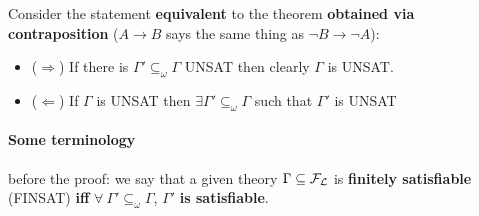 	Consider the statement \textbf{equivalent} to the theorem \textbf{obtained via contraposition} ($A \rightarrow B$ says the same thing as $\neg B \rightarrow \neg A$):
	\begin{itemize}
		\item ($\Rightarrow$) If there is $\Gamma' \subseteq_\omega \Gamma$ UNSAT then clearly $\Gamma$ is UNSAT.

		\item ($\Leftarrow$) If $\Gamma$ is UNSAT then $\exists \Gamma' \subseteq_\omega \Gamma$ such that $\Gamma'$ is UNSAT
	  \end{itemize}

	\newpage

	\paragraph{Some terminology} before the proof: we say that a given theory $\Gamma \subseteq \mathcal{F}_\mathcal{L}$ is \textbf{finitely satisfiable} (FINSAT) \textbf{iff} $\forall \ \Gamma' \subseteq_\omega \Gamma$, $\Gamma'$ \textbf{is satisfiable}. \\

